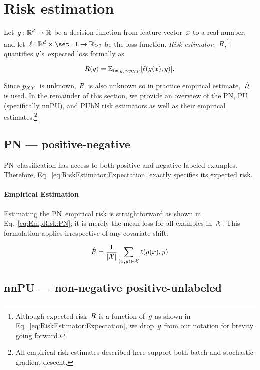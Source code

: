 \section{Risk estimation}\label{sec:RiskEstimators}

Let~${g:\mathbb{R}^{d}\rightarrow\mathbb{R}}$ be a decision function from feature vector~$x$ to a real number, and let~$\func{\loss}{\domainX \times \domainY}{\real_{{\geq}0}}$ be the loss function.  \textit{Risk estimator},~$R$,\footnote{Although expected risk~$R$ is a function of~$g$ as shown in Eq.~\eqref{eq:RiskEstimator:Expectation}, we drop~$g$ from our notation for brevity going forward.} quantifies $g$'s~expected loss formally as

\begin{equation}\label{eq:RiskEstimator:Expectation}
  R(g) = \mathbb{E}_{(x,y) \sim p_{XY}}\lbrack\ell\mathopen{}\left(g\mathopen{}\left(x\right)\mathclose{},y\right)\mathclose{}\rbrack\text{.}
\end{equation}

Since $p_{XY}$~is unknown, $R$~is also unknown so in practice empirical estimate,~$\hat{R}$ is used.  In the remainder of this section, we provide an overview of the PN, PU (specifically nnPU), and PUbN risk estimators as well as their empirical estimates.\footnote{All empirical risk estimates described here support both batch and stochastic gradient descent.}

\subsection{PN --- positive-negative}

PN~classification has access to both positive and negative labeled examples.  Therefore, Eq.~\eqref{eq:RiskEstimator:Expectation} exactly specifies its expected risk.

\paragraph{Empirical Estimation} Estimating the PN~empirical risk is straightforward as shown in Eq.~\eqref{eq:EmpRisk:PN}; it is merely the mean loss for all examples in~$\mathcal{X}$.  This formulation applies irrespective of any covariate shift.

\begin{equation}\label{eq:EmpRisk:PN}
  \hat{R} = \frac{1}{\lvert\mathcal{X}\rvert} \sum_{(x,y) \in \mathcal{X}} \ell\mathopen{}\left(g\mathopen{}\left(x\right)\mathclose{},y\right)\mathclose{}
\end{equation}

\subsection{nnPU --- non-negative positive-unlabeled}

